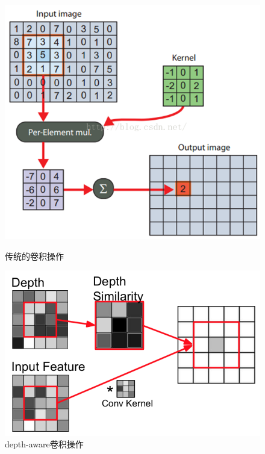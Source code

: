 \documentclass[cn]{elegantbook}
\begin{document}
\begin{figure}[h]
	\centering
	\begin{minipage}[t]{0.4\textwidth}
		\centering
		\includegraphics[width=\textwidth]{images/sconv.png}
		\caption{\label{sconv}传统的卷积操作}
	\end{minipage}
	\begin{minipage}[t]{0.4\textwidth}
		\centering
		\includegraphics[width=\textwidth]{images/dconv.png}
		\caption{\label{dconv}depth-aware卷积操作}
	\end{minipage}
\end{figure}
\end{document}
